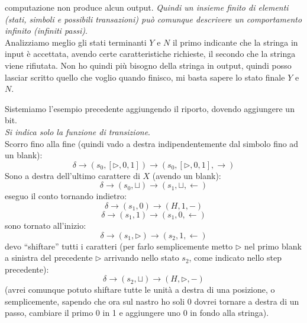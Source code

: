 \documentclass[a4paper,12pt, oneside]{book}
\begin{document}
computazione non produce alcun output. \textit{Quindi un insieme finito di
  elementi (stati, simboli e possibili transazioni) può comunque descrivere un
  comportamento infinito (infiniti passi)}.\\ 
Analizziamo meglio gli stati terminanti $Y$ e $N$ il primo indicante che la
stringa in input è accettata, avendo certe caratteristiche richieste, il secondo
che la stringa viene rifiutata. Non ho quindi più bisogno della stringa in
output, quindi posso lasciar scritto quello che voglio quando finisco, mi basta
sapere lo stato finale $Y$ e $N$.
\begin{esempio}
  Sistemiamo l'esempio precedente aggiungendo il riporto, dovendo aggiungere un
  bit. \\
 \textit{Si indica solo la funzione di transizione}.\\
  Scorro fino alla fine (quindi vado a destra indipendentemente dal simbolo fino
  ad un blank):
  \[\delta\to(s_0,[\triangleright, 0,1])\to(s_0,[\triangleright, 0,1],
    \rightarrow)\]
  Sono a destra dell'ultimo carattere di $X$ (avendo un blank):
  \[\delta\to(s_0,\sqcup)\to(s_1,\sqcup,\leftarrow)\]
  eseguo il conto tornando indietro:
  \[\delta\to(s_1,0)\to(H,1,-)\]
  \[\delta\to(s_1,1)\to(s_1,0,\leftarrow)\]
  sono tornato all'inizio:
  \[\delta\to(s_1,\triangleright)\to(s_2,1,\leftarrow)\]
  devo ``shiftare'' tutti i caratteri (per farlo semplicemente metto
  $\triangleright$ nel primo blank a sinistra del precedente $\triangleright$
  arrivando nello stato $s_2$, come indicato nello step precedente):
  \[\delta\to(s_2,\sqcup)\to(H,\triangleright,-)\]
  (avrei comunque potuto shiftare tutte le unità a destra di una posizione, o
  semplicemente, sapendo che ora sul nastro ho soli 0 dovrei tornare a destra di
  un passo, cambiare il primo 0 in 1 e aggiungere uno 0 in fondo alla
  stringa).
\end{esempio}
\end{document}
